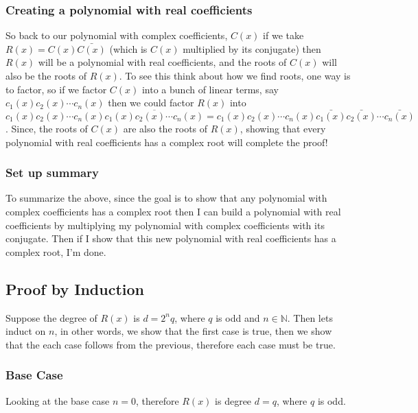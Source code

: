 \documentclass[12pt]{article}
\begin{document}
\subsubsection*{Creating a polynomial with real coefficients}
So back to our polynomial with complex coefficients, $C(x)$ if we take $R(x) = C(x) \bar{C(x)}$ (which is $C(x)$ multiplied by its conjugate) then $R(x)$ will be a polynomial with real coefficients, and the roots of $C(x)$ will also be the roots of $R(x)$.  To see this think about how we find roots, one way is to factor, so if we factor $C(x)$ into a bunch of linear terms, say $c_1(x)c_2(x)\cdots c_n(x)$ then we could factor $R(x)$ into $$c_1(x)c_2(x)\cdots c_n(x)\overline{c_1(x)c_2(x) \cdots c_n(x)}= c_1(x)c_2(x)\cdots c_n(x)\bar{c_1(x)} \bar{c_2(x)} \cdots \bar{c_n(x)}$$.  Since, the roots of $C(x)$ are also the roots of $R(x)$, showing that every polynomial with real coefficients has a complex root will complete the proof!


\subsubsection*{Set up summary}
To summarize the above, since the goal is to show that any polynomial with complex coefficients has a complex root then I can build a polynomial with real coefficients by multiplying my polynomial with complex coefficients with its conjugate.  Then if I show that this new polynomial with real coefficients has a complex root, I'm done.

\subsection*{Proof by Induction}
Suppose the degree of $R(x)$ is $d=2^n q$, where $q$ is odd and $n \in \mathbb{N}$.   
Then lets induct on $n$, in other words, we show that the first case is true, then we show that the each case follows from the previous, therefore each case must be true.

\pagebreak
\subsubsection*{Base Case}
Looking at the base case $n=0$, therefore $R(x)$ is degree $d=q$, where $q$ is odd. 
\end{document}
